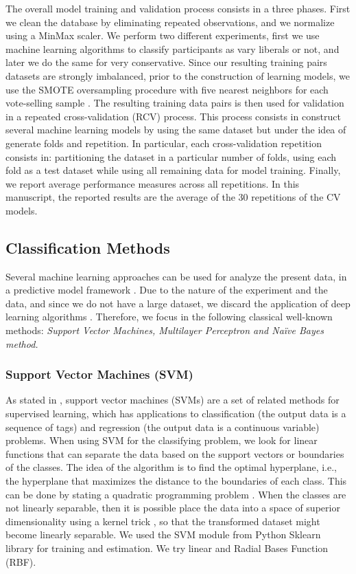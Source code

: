 \documentclass[onesided]{article}\usepackage[]{graphicx}\usepackage[]{color}
\begin{document}
The overall model training and validation process consists in a three phases. First we clean the database by eliminating repeated observations, and we normalize using a MinMax scaler. We perform two different experiments, first we use machine learning algorithms to classify participants as vary liberals or not, and later we do the same for very conservative. Since our resulting training pairs datasets are strongly imbalanced, prior to the construction of learning models, we use the SMOTE \parencite{chawla2002smote} oversampling procedure with five nearest neighbors for each vote-selling sample \parencite{artetxe2020balanced}. The resulting training data pairs is then used for validation in a repeated cross-validation (RCV) process. This process consists in construct several machine learning models by using the same dataset but under the idea of generate folds and repetition. In particular, each cross-validation repetition consists in: partitioning the dataset in a particular number of folds, using each fold as a test dataset while using all remaining data for model training. Finally, we report average performance measures across all repetitions. In this manuscript, the reported results are the average of the 30 repetitions of the CV models.

\subsection{Classification Methods}

Several machine learning approaches can be used for analyze the present data, in a predictive model framework \parencite{vapnik2013nature,witten2002data,maimon2005data}. Due to the nature of the experiment and the data, and since we do not have a large dataset, we discard the application of deep learning algorithms \parencite{balas2019handbook}. Therefore, we focus in the following classical well-known methods: \textit{Support Vector Machines, Multilayer Perceptron and Na\"ive Bayes method.}

\subsubsection{Support Vector Machines (SVM)} As stated in \parencite[Chapter 12]{maimon2005data}, support vector machines (SVMs) are a set of related methods for supervised learning, which has applications to classification (the output data is a sequence of tags) and regression (the output data is a continuous variable) problems. When using SVM for the classifying problem, we look for linear functions that can separate the data based on the support vectors or boundaries of the classes. The idea of the algorithm is to find the optimal hyperplane, i.e., the hyperplane that maximizes the distance to the boundaries of each class. This can be done by stating a quadratic programming problem \parencite{vapnik2013nature}. When the classes are not linearly separable, then it is possible place the data into a space of superior dimensionality using a kernel trick \parencite{vapnik2013nature,maimon2005data}, so that the transformed dataset might become linearly separable. We used the SVM module from Python Sklearn library for training and estimation. We try linear and Radial Bases Function (RBF).
\end{document}
